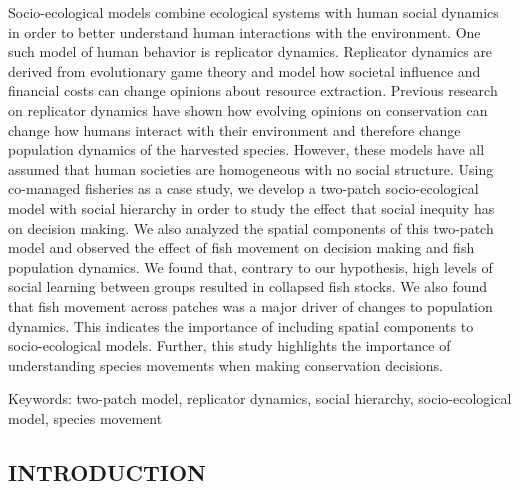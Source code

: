 \documentclass[
  12pt,
]{article}
\begin{document}
Socio-ecological models combine ecological systems with human social dynamics in order to better understand human interactions with the environment. One such model of human behavior is replicator dynamics. Replicator dynamics are derived from evolutionary game theory and model how societal influence and financial costs can change opinions about resource extraction. Previous research on replicator dynamics have shown how evolving opinions on conservation can change how humans interact with their environment and therefore change population dynamics of the harvested species. However, these models have all assumed that human societies are homogeneous with no social structure. Using co-managed fisheries as a case study, we develop a two-patch socio-ecological model with social hierarchy in order to study the effect that social inequity has on decision making. We also analyzed the spatial components of this two-patch model and observed the effect of fish movement on decision making and fish population dynamics. We found that, contrary to our hypothesis, high levels of social learning between groups resulted in collapsed fish stocks. We also found that fish movement across patches was a major driver of changes to population dynamics. This indicates the importance of including spatial components to socio-ecological models. Further, this study highlights the importance of understanding species movements when making conservation decisions.

Keywords: two-patch model, replicator dynamics, social hierarchy, socio-ecological model, species movement

\hypertarget{introduction-2}{%
\subsection{INTRODUCTION}\label{introduction-2}}
\end{document}
